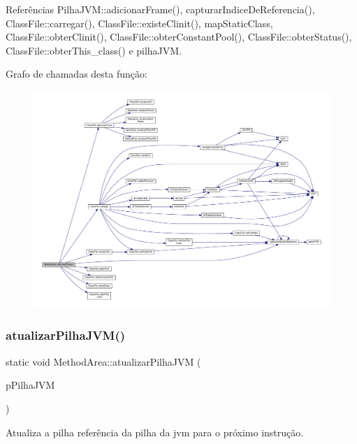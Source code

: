 Referências Pilha\+J\+V\+M\+::adicionar\+Frame(), capturar\+Indice\+De\+Referencia(), Class\+File\+::carregar(), Class\+File\+::existe\+Clinit(), map\+Static\+Class, Class\+File\+::obter\+Clinit(), Class\+File\+::obter\+Constant\+Pool(), Class\+File\+::obter\+Status(), Class\+File\+::obter\+This\+\_\+class() e pilha\+J\+VM.

Grafo de chamadas desta função\+:
\nopagebreak
\begin{figure}[H]
\begin{center}
\leavevmode
\includegraphics[width=350pt]{classMethodArea_ac2a5ab0e6b36c9af7062f145218b4cf0_cgraph}
\end{center}
\end{figure}
\mbox{\label{classMethodArea_a6ee32cdf91b461ff3c8a278b5d0cd126}} 
\subsubsection{\texorpdfstring{atualizar\+Pilha\+J\+V\+M()}{atualizarPilhaJVM()}}
{\footnotesize\ttfamily static void Method\+Area\+::atualizar\+Pilha\+J\+VM (\begin{DoxyParamCaption}\item[{\hyperlink{classPilhaJVM}{Pilha\+J\+VM} $\ast$}]{p\+Pilha\+J\+VM }\end{DoxyParamCaption})\hspace{0.3cm}{\ttfamily [static]}}



Atualiza a pilha referência da pilha da jvm para o próximo instrução. 


